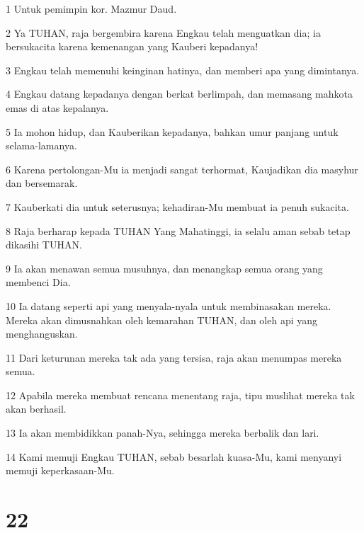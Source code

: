 \par 1 Untuk pemimpin kor. Mazmur Daud.
\par 2 Ya TUHAN, raja bergembira karena Engkau telah menguatkan dia; ia bersukacita karena kemenangan yang Kauberi kepadanya!
\par 3 Engkau telah memenuhi keinginan hatinya, dan memberi apa yang dimintanya.
\par 4 Engkau datang kepadanya dengan berkat berlimpah, dan memasang mahkota emas di atas kepalanya.
\par 5 Ia mohon hidup, dan Kauberikan kepadanya, bahkan umur panjang untuk selama-lamanya.
\par 6 Karena pertolongan-Mu ia menjadi sangat terhormat, Kaujadikan dia masyhur dan bersemarak.
\par 7 Kauberkati dia untuk seterusnya; kehadiran-Mu membuat ia penuh sukacita.
\par 8 Raja berharap kepada TUHAN Yang Mahatinggi, ia selalu aman sebab tetap dikasihi TUHAN.
\par 9 Ia akan menawan semua musuhnya, dan menangkap semua orang yang membenci Dia.
\par 10 Ia datang seperti api yang menyala-nyala untuk membinasakan mereka. Mereka akan dimusnahkan oleh kemarahan TUHAN, dan oleh api yang menghanguskan.
\par 11 Dari keturunan mereka tak ada yang tersisa, raja akan menumpas mereka semua.
\par 12 Apabila mereka membuat rencana menentang raja, tipu muslihat mereka tak akan berhasil.
\par 13 Ia akan membidikkan panah-Nya, sehingga mereka berbalik dan lari.
\par 14 Kami memuji Engkau TUHAN, sebab besarlah kuasa-Mu, kami menyanyi memuji keperkasaan-Mu.

\chapter{22}


